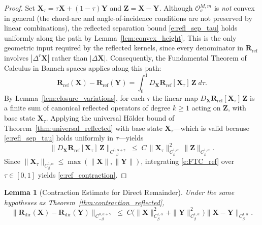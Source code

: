 \documentclass{amsart}
\newtheorem{lemma}[theorem]{Lemma}
\begin{document}
\begin{proof}
Set $\mathbf{X}_\tau = \tau\mathbf{X} + (1-\tau)\mathbf{Y}$ and $\mathbf{Z} = \mathbf{X} - \mathbf{Y}$.
Although $\mathcal{O}^{M,m}_\sigma$ is \emph{not} convex in general (the
chord-arc and angle-of-incidence conditions are not preserved by linear
combinations), the reflected separation bound \eqref{e:refl_sep_tau} holds
uniformly along the path by Lemma~\ref{lem:convex_height}.  This is the only
geometric input required by the reflected kernels, since every denominator in
$\mathbf{R}_{\mathrm{ref}}$ involves $|\Delta^r \mathbf{X}|$ rather than
$|\Delta\mathbf{X}|$.  Consequently, the Fundamental Theorem of Calculus in
Banach spaces applies along this path:
\begin{equation}\label{e:FTC_ref}
  \mathbf{R}_{\mathrm{ref}}(\mathbf{X}) - \mathbf{R}_{\mathrm{ref}}(\mathbf{Y})
  = \int_0^1 D_{\mathbf{X}}\mathbf{R}_{\mathrm{ref}}[\mathbf{X}_\tau]\,\mathbf{Z}\;d\tau.
\end{equation}
By Lemma~\ref{lem:closure_variations}, for each $\tau$ the linear map
$D_{\mathbf{X}}\mathbf{R}_{\mathrm{ref}}[\mathbf{X}_\tau]\,\mathbf{Z}$ is a finite
sum of canonical reflected operators of degree $k \geq 1$ acting on $\mathbf{Z}$,
with base state $\mathbf{X}_\tau$.  Applying the universal Hölder bound of
Theorem~\ref{thm:universal_reflected} with base state $\mathbf{X}_\tau$---which
is valid because \eqref{e:refl_sep_tau} holds uniformly in $\tau$---yields
\[
  \bigl\|D_{\mathbf{X}}\mathbf{R}_{\mathrm{ref}}[\mathbf{X}_\tau]\,\mathbf{Z}
  \bigr\|_{C^{0,\alpha+\gamma}_{-\beta}}
  \;\leq\;
  C\,\|\mathbf{X}_\tau\|_{C^{1,\alpha}_\beta}^2\,\|\mathbf{Z}\|_{C^{1,\alpha}_\beta}.
\]
Since $\|\mathbf{X}_\tau\|_{C^{1,\alpha}_\beta} \leq \max(\|\mathbf{X}\|,\|\mathbf{Y}\|)$,
integrating \eqref{e:FTC_ref} over $\tau \in [0,1]$ yields \eqref{e:ref_contraction}.
\end{proof}


\begin{lemma}[Contraction Estimate for Direct Remainder]
\label{lem:direct_contraction}
Under the same hypotheses as Theorem~\ref{thm:contraction_reflected},
\begin{equation}\label{e:dir_contraction}
  \|\mathbf{R}_{\mathrm{dir}}(\mathbf{X}) - \mathbf{R}_{\mathrm{dir}}(\mathbf{Y})\|_{C^{0,\alpha+\gamma}_{-\beta}}
  \;\leq\;
  C\bigl(\|\mathbf{X}\|_{C^{1,\alpha}_\beta}^2 + \|\mathbf{Y}\|_{C^{1,\alpha}_\beta}^2\bigr)
  \|\mathbf{X} - \mathbf{Y}\|_{C^{1,\alpha}_\beta}.
\end{equation}
\end{lemma}
\end{document}
